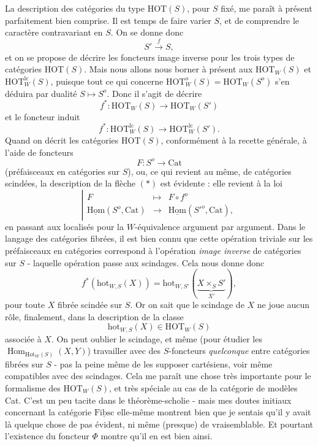 \documentclass[11pt]{article}
\newcommand{\printedpage}[1]{\marginpar{\footnotesize p.~#1}}
\newcommand{\msp}[1]{\marginpar{\footnotesize [#1]}}
\newcommand{\HOT}{\mathrm{HOT}}
\newcommand{\Cat}{\mathrm{Cat}}
\newcommand{\hot}{\mathrm{hot}}
\newcommand{\Hom}{\operatorname{Hom}}
\begin{document}
La description des catégories du type HOT$(S)$, pour $S$ fixé, me paraît à présent parfaitement bien comprise. Il est temps de faire varier $S$, et de comprendre le caractère contravariant en $S$. On se donne donc
\[S' \xrightarrow{f} S,\]
et on se propose de décrire les foncteurs image inverse pour les trois types de catégories HOT$(S)$. Mais nous allons nous borner à présent aux $\HOT_W(S)$ et $\HOT^{\mathrm{lc}}_W(S)$, puisque tout ce qui concerne $\HOT^o_W(S) = \HOT_W(S^o)$ s'en déduira par dualité $S \longmapsto S^o$. Donc il s'agit de décrire
\msp{page 116}
\[f^* : \HOT_W(S) \longrightarrow \HOT_W(S') \tag*{$(*)$}\]
et le foncteur induit
\[f^* : \HOT^{\mathrm{lc}}_W(S) \longrightarrow \HOT^{\mathrm{lc}}_W(S').\]
Quand on décrit les catégories HOT$(S)$, conformément à la recette générale, à l'aide de foncteurs
\[F : S^o \longrightarrow \Cat\]
(préfaisceaux en catégories sur $S$), ou, ce qui revient au même, de catégories scindées, la description de la flèche $(*)$ est évidente : elle revient à la loi
\[\left|\begin{array}{rcl}
F & \longmapsto & F \circ f^o \\[1ex]
\underline{\mathrm{Hom}}(S^o, \Cat) & \longrightarrow & \underline{\mathrm{Hom}}(S'^o, \Cat),
\end{array}\right.\]
en passant aux localisés pour la $W$-équivalence argument par argument. Dans le langage des catégories fibrées, il est bien connu que cette opération triviale sur les préfaisceaux en catégories correspond à l'opération \textit{image inverse} de catégories sur $S$ - laquelle opération passe aux scindages. Cela nous donne donc
\[f^*(\hot_{W,S}(X)) = \hot_{W,S'}(\underbrace{X \times_S S'}_{X'}),\]
pour toute $X$ fibrée scindée sur $S$. Or on sait que le scindage de $X$ ne joue aucun rôle, finalement, dans la description de la classe
\[\hot_{W,S}(X) \in \HOT_W(S)\]
\printedpage{73}
\msp{page 117}
associée à $X$. On peut oublier le scindage, et même (pour étudier les $\Hom_{\mathrm{Hot}_W(S)}(X, Y)$) travailler avec des $S$-foncteurs \textit{quelconque} entre catégories fibrées sur $S$ - pas la peine même de les supposer cartésiens, voir même compatibles avec des scindages. Cela me paraît une chose très importante pour le formalisme des $\HOT_W(S)$, et très spéciale au cas de la catégorie de modèles Cat. C'est un peu tacite dans le théorème-scholie - mais mes doutes initiaux concernant la catégorie $\underline{\mathrm{Fibsc}}$ elle-même montrent bien que je sentais qu'il y avait là quelque chose de pas évident, ni même (presque) de vraisemblable. Et pourtant l'existence du foncteur $\Phi$ montre qu'il en est bien ainsi.
\end{document}
